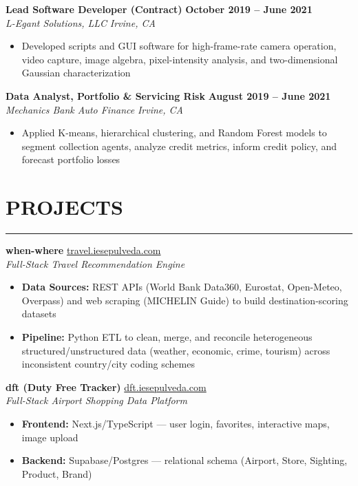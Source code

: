 \documentclass[10.5pt,letterpaper]{article}
\newcommand{\ressection}[1]{%
	\vspace{1.5mm}
	\section*{#1}
	\vspace{0.5mm}
	\hrule
	\vspace{1mm}
}
\newenvironment{myitemize}
{ \begin{itemize}[label={\textbullet}, leftmargin=*, topsep=1pt, partopsep=0pt, itemsep=1pt, parsep=0pt] }
	{ \end{itemize}                  }
\begin{document}
\noindent\textbf{Lead Software Developer (Contract)} \hfill \textbf{October 2019 -- June 2021} \\
\textit{L-Egant Solutions, LLC} \hfill \textit{Irvine, CA}
\begin{myitemize}
	\item Developed scripts and GUI software for high-frame-rate camera operation, video capture, image algebra, pixel-intensity analysis, and two-dimensional Gaussian characterization
\end{myitemize}

\noindent\textbf{Data Analyst, Portfolio \& Servicing Risk} \hfill \textbf{August 2019 -- June 2021} \\
\textit{Mechanics Bank Auto Finance} \hfill \textit{Irvine, CA}
\begin{myitemize}
	\item Applied K-means, hierarchical clustering, and Random Forest models to segment collection agents, analyze credit metrics, inform credit policy, and forecast portfolio losses
\end{myitemize}

\ressection{PROJECTS}

\noindent\textbf{when-where} \hfill \href{https://travel.iesepulveda.com}{travel.iesepulveda.com} \\
\textit{Full-Stack Travel Recommendation Engine}
\begin{myitemize}
	\item \textbf{Data Sources:} REST APIs (World Bank Data360, Eurostat, Open-Meteo, Overpass) and web scraping (MICHELIN Guide) to build destination-scoring datasets
	\item \textbf{Pipeline:} Python ETL to clean, merge, and reconcile heterogeneous structured/unstructured data (weather, economic, crime, tourism) across inconsistent country/city coding schemes
\end{myitemize}

\noindent\textbf{dft (Duty Free Tracker)} \hfill \href{https://dft.iesepulveda.com}{dft.iesepulveda.com} \\
\textit{Full-Stack Airport Shopping Data Platform}
\begin{myitemize}
	\item \textbf{Frontend:} Next.js/TypeScript --- user login, favorites, interactive maps, image upload
	\item \textbf{Backend:} Supabase/Postgres --- relational schema (Airport, Store, Sighting, Product, Brand)
\end{myitemize}
\end{document}
